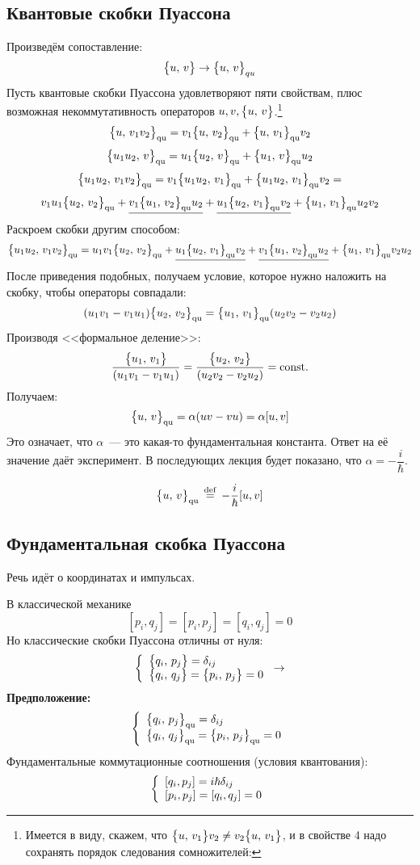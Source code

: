 \subsection{Квантовые скобки Пуассона}
Произведём сопоставление:
$$
    { \big\{ u, \, v \big\} } \to { { \big\{ u, \, v \big\} } }_{qu}
$$
Пусть квантовые скобки Пуассона удовлетворяют пяти свойствам, плюс возможная некоммутативность операторов $u, v, { \big\{ u, \, v \big\} }$.\footnote{Имеется в виду, скажем, что ${ \big\{ u, \, v_1 \big\} } v_2 \neq v_2{ \big\{ u, \, v_1 \big\} }$, и в свойстве 4 надо сохранять порядок следования сомножителей:}
$$
    { \big\{ u, \, v_1v_2 \big\} }_{\text{qu}} = v_1 { \big\{ u, \, v_2 \big\} }_{\text{qu}} + { \big\{ u, \, v_1 \big\} }_{\text{qu}} v_2
$$
$$
    { \big\{ u_1 u_2, \, v \big\} }_{\text{qu}} = u_1 { \big\{ u_2, \, v \big\} }_{\text{qu}} + { \big\{ u_1, \, v \big\} }_{\text{qu}} u_2
$$
$$
    { \big\{ u_1 u_2, \, v_1 v_2 \big\} }_{\text{qu}} = v_1 { \big\{ u_1 u_2, \, v_1 \big\} }_{\text{qu}} + { \big\{ u_1 u_2, \, v_1 \big\} }_{\text{qu}} v_2=
$$
$$
    v_1 u_1 { \big\{ u_2, \, v_2 \big\} }_{\text{qu}} + \underline{v_1 { \big\{ u_1, \, v_2 \big\} }_{\text{qu}} u_2} + \underline{u_1 { \big\{ u_2, \, v_1 \big\} }_{\text{qu}} v_2} + { \big\{ u_1, \, v_1 \big\} }_{\text{qu}} u_2 v_2
$$
Раскроем скобки другим способом:
$$
    { \big\{ u_1 u_2, \, v_1 v_2 \big\} }_{\text{qu}} =
    u_1 v_1 { \big\{ u_2, \, v_2 \big\} }_{\text{qu}} + \underline{u_1 { \big\{ u_2, \, v_1 \big\} }_{\text{qu}} v_2} + \underline{v_1 { \big\{ u_1, \, v_2 \big\} }_{\text{qu}} u_2} + { \big\{ u_1, \, v_1 \big\} }_{\text{qu}} v_2 u_2
$$
После приведения подобных, получаем условие, которое нужно наложить на скобку, чтобы операторы совпадали:
$$
    (u_1 v_1 - v_1 u_1) { \big\{ u_2, \, v_2 \big\} }_{\text{qu}} = { \big\{ u_1, \, v_1 \big\} }_{\text{qu}} (u_2 v_2 - v_2 u_2)
$$
Производя <<формальное деление>>:
$$
    \dfrac{{ \big\{ u_1, \, v_1 \big\} }}{({ u_1 v_1 - v_1 u_1 })} = \dfrac{{ \big\{ u_2, \, v_2 \big\} }}{({ u_2 v_2 - v_2 u_2 })} = \mathrm{const}.
$$
Получаем:
$$
    { \big\{ u, \, v \big\} }_{\text{qu}} = \alpha ({ u v - v u }) = \alpha [u, v]
$$
Это означает, что $\alpha$~--- это какая-то фундаментальная константа. Ответ на её значение даёт эксперимент. В последующих лекция будет показано, что $\alpha = -\dfrac{i}{\hbar}$.

\Def
$$
    { \big\{ u, \, v \big\} }_{\text{qu}} \,\overset{\mathrm{def}}{=}\, -\dfrac i \hbar [u, v]
$$
\subsection{Фундаментальная скобка Пуассона}
Речь идёт о координатах и импульсах.

В классической механике
$$
    [p_i, q_j] = [p_i, p_j] = [q_i, q_j] = 0
$$
Но классические скобки Пуассона отличны от нуля:
$$
  \left\{
    \begin{array}{l}
      { \big\{ q_i, \, p_j \big\} } = \delta_{ij} \\
      { \big\{ q_i, \, q_j \big\} } = { \big\{ p_i, \, p_j \big\} } = 0
    \end{array}
  \right.
  \to
$$
\textbf{Предположение:}
$$
  \left\{
    \begin{array}{l}
      { \big\{ q_i, \, p_j \big\} }_{\text{qu}} = \delta_{ij} \\
      { \big\{ q_i, \, q_j \big\} }_{\text{qu}} = { \big\{ p_i, \, p_j \big\} }_{\text{qu}} = 0
    \end{array}
  \right.
$$
Фундаментальные коммутационные соотношения (условия квантования):
$$
\left\{
\begin{array}{l}
     [q_i, p_j] = i \hbar \delta_{ij} \\[0pt]
     [p_i, p_j] = [q_i, q_j] = 0
\end{array}
\right.          
$$
